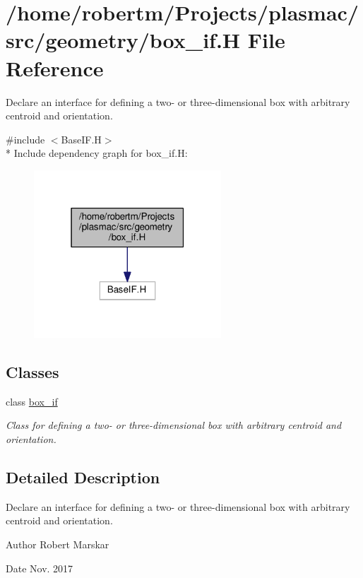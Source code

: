 \hypertarget{box__if_8H}{}\section{/home/robertm/\+Projects/plasmac/src/geometry/box\+\_\+if.H File Reference}
\label{box__if_8H}


Declare an interface for defining a two-\/ or three-\/dimensional box with arbitrary centroid and orientation.  


{\ttfamily \#include $<$Base\+I\+F.\+H$>$}\\*
Include dependency graph for box\+\_\+if.\+H\+:\nopagebreak
\begin{figure}[H]
\begin{center}
\leavevmode
\includegraphics[width=199pt]{box__if_8H__incl}
\end{center}
\end{figure}
\subsection*{Classes}
\begin{DoxyCompactItemize}
\item 
class \hyperlink{classbox__if}{box\+\_\+if}
\begin{DoxyCompactList}\small\item\em Class for defining a two-\/ or three-\/dimensional box with arbitrary centroid and orientation. \end{DoxyCompactList}\end{DoxyCompactItemize}


\subsection{Detailed Description}
Declare an interface for defining a two-\/ or three-\/dimensional box with arbitrary centroid and orientation. 

\begin{DoxyAuthor}{Author}
Robert Marskar 
\end{DoxyAuthor}
\begin{DoxyDate}{Date}
Nov. 2017 
\end{DoxyDate}
